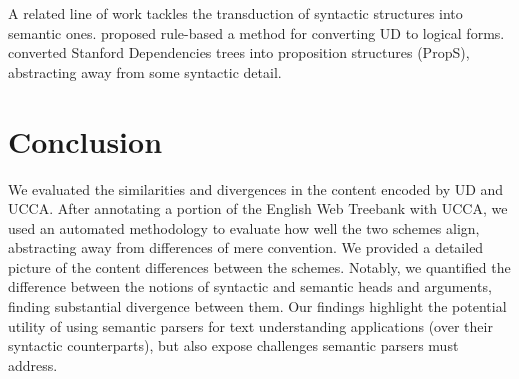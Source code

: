 \documentclass[11pt,a4paper]{article}
\begin{document}
A related line of work tackles the transduction of syntactic structures into semantic ones.
 proposed rule-based a method for converting UD
to logical forms. 
 converted Stanford Dependencies trees into
proposition structures ({\sc PropS}), abstracting away from some syntactic detail.


\section{Conclusion}\label{sec:conclusion}

We evaluated the similarities and divergences in the content encoded by UD and UCCA. 
After annotating a portion of the English Web Treebank with UCCA,
  we used an automated methodology to evaluate how well the two schemes align,
  abstracting away from differences of mere convention.
We provided a detailed picture of the content differences between the schemes.
Notably, we quantified the difference between the notions of syntactic and semantic heads
  and arguments, finding substantial divergence between them.
Our findings highlight the potential utility of using semantic parsers for text understanding applications
  (over their syntactic counterparts), but also expose challenges semantic parsers must address.








\end{document}
